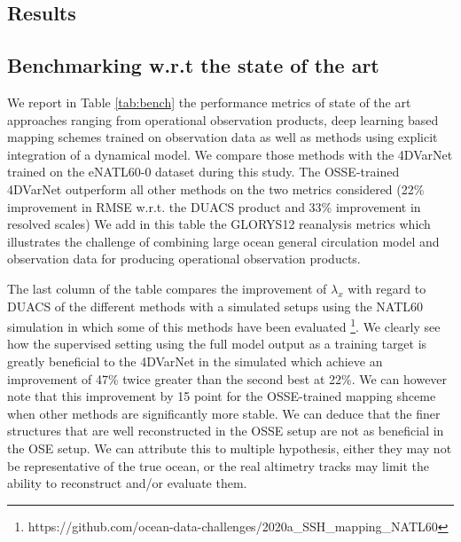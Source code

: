 \begin{bibunit}
\section{Results}
\label{sec:results}

\subsection{Benchmarking w.r.t the state of the art}
\label{ssec:benchmarks}

We report in Table \ref{tab:bench} the performance metrics of state of the art approaches ranging from operational observation products, deep learning based mapping schemes trained on observation data as well as methods using explicit integration of a dynamical model.
We compare those methods with the 4DVarNet trained on the eNATL60-0 dataset during this study. 
The OSSE-trained 4DVarNet outperform all other methods on the two metrics considered (22\% improvement in RMSE w.r.t. the DUACS product and 33\% improvement in resolved scales)
We add in this table the GLORYS12 reanalysis metrics which illustrates the challenge of combining large ocean general circulation model and observation data for producing operational observation products.


The last column of the table compares the improvement of $\lambda_x$ with regard to DUACS of the different methods with a simulated setups using the NATL60 simulation in which some of this methods have been evaluated \footnote{https://github.com/ocean-data-challenges/2020a\_SSH\_mapping\_NATL60}. We clearly see how the supervised setting using the full model output as a training target is greatly beneficial to the 4DVarNet in the simulated which achieve an improvement of 47\% twice greater than the second best at 22\%. We can however note that this improvement by 15 point for the OSSE-trained mapping shceme when other methods are significantly more stable. We can deduce that the finer structures that are well reconstructed in the OSSE setup are not as beneficial in the OSE setup. We can attribute this to multiple hypothesis, either they may not be representative of the true ocean, or the real altimetry tracks may limit the ability to reconstruct and/or evaluate them.  




\end{bibunit}
